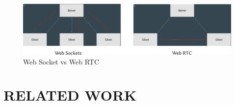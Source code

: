 \documentclass{fisatproject}
\begin{document}
	\begin{center}
	\begin{figure}[h]
		
		\includegraphics[scale=.37]{webrtcfig.png}
		\caption{Web Socket vs Web RTC}
		
	\end{figure}
\end{center}


\chapter{RELATED WORK}
\end{document}
